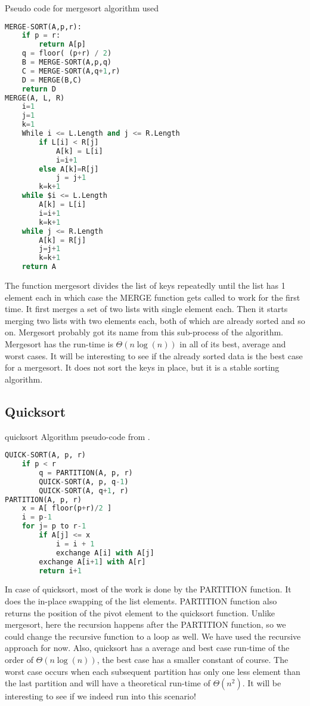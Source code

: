 \documentclass[sigconf, nonacm, natbib, screen, balance=False]{acmart}
\begin{document}
\begin{listing}
  \caption{Pseudo code for mergesort algorithm used}
  \label{lst:merge_algo}
\begin{lstlisting}[language=Python]
MERGE-SORT(A,p,r):    
    if p = r:
        return A[p]
    q = floor( (p+r) / 2) 
    B = MERGE-SORT(A,p,q)
    C = MERGE-SORT(A,q+1,r)
    D = MERGE(B,C)
    return D
MERGE(A, L, R)
    i=1
    j=1
    k=1
    While i <= L.Length and j <= R.Length
        if L[i] < R[j]
            A[k] = L[i]
            i=i+1
        else A[k]=R[j]
            j = j+1
        k=k+1
    while $i <= L.Length
        A[k] = L[i]
        i=i+1
        k=k+1
    while j <= R.Length
        A[k] = R[j]
        j=j+1
        k=k+1 
    return A
\end{lstlisting}
\end{listing}
The function mergesort divides the list of keys repeatedly until the list has 1 element each in which case the MERGE function gets called to work for the first time. It first merges a set of two lists with single element each. Then it starts merging two lists with two elements each, both of which are already sorted and so on. Mergesort probably got its name from this sub-process of the algorithm. \newline
Mergesort has the run-time is $\Theta \left(n\log\left(n\right)\right)$ in all of its best, average and worst cases. It will be interesting to see if the already sorted data is the best case for a mergesort. It does not sort the keys in place, but it is a stable sorting algorithm.
\subsection{Quicksort}\label{sec:quicksort}

\begin{listing}
  \caption{quicksort Algorithm pseudo-code from \citet[Ch.~2.3.1]{CLRS_2009}.}
  \label{lst:quick_algo}
\begin{lstlisting}[language=Python]
QUICK-SORT(A, p, r)
    if p < r
        q = PARTITION(A, p, r)
        QUICK-SORT(A, p, q-1)
        QUICK-SORT(A, q+1, r)
PARTITION(A, p, r)
	x = A[ floor(p+r)/2 ]
	i = p-1
	for j= p to r-1
		if A[j] <= x
			i = i + 1
			exchange A[i] with A[j]
		exchange A[i+1] with A[r]
		return i+1
\end{lstlisting}
\end{listing}

In case of quicksort, most of the work is done by the PARTITION function. It does the in-place swapping of the list elements. PARTITION function also returns the position of the pivot element to the quicksort function. Unlike mergesort, here the recursion happens after the PARTITION function, so we could change the recursive function to a loop as well. We have used the recursive approach for now.\newline
Also, quicksort has a average and best case run-time of the order of $\Theta \left(n\log\left(n\right)\right)$, the best case has a smaller constant of course. The worst case occurs when each subsequent partition has only one less element than the last partition and will have a theoretical run-time of $\Theta \left(n^2\right)$. It will be interesting to see if we indeed run into this scenario!
\end{document}
